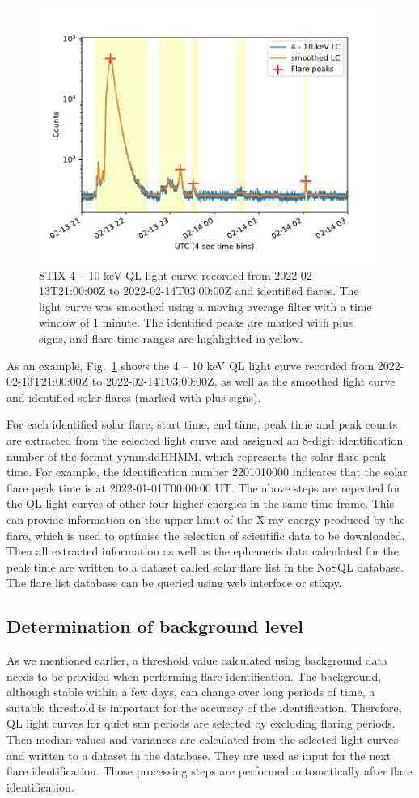 \documentclass[referee]{aa} %
\begin{document}
\begin{figure}
  \centering
  \includegraphics[width=0.8\linewidth]{figures/flaredet.pdf}
  \caption{STIX 4 -- 10 keV QL light curve recorded from  2022-02-13T21:00:00Z to 2022-02-14T03:00:00Z and 
  identified flares.   The light curve was smoothed using a moving average filter with a time window
  of 1 minute. The identified peaks are marked with plus signs, and flare time ranges are highlighted in yellow.
  }
  \label{fig:flare-det}
\end{figure}
As an example, Fig.~\ref{fig:flare-det} shows  the 4 -- 10 keV QL  light curve recorded from 
2022-02-13T21:00:00Z to 2022-02-14T03:00:00Z, as well as the smoothed light curve and  identified solar flares (marked with plus signs).

For each identified solar flare,  start time, end time, peak time and peak 
counts are extracted from the selected light curve and assigned 
an 8-digit identification number of the format yymmddHHMM, which represents the solar flare peak time. 
For example, the identification number 2201010000  indicates that 
the solar flare peak time is at 2022-01-01T00:00:00 UT. 
The above steps are repeated  for the QL light curves of other four higher energies
in the same time frame. This can provide information on the upper limit of the X-ray energy produced by the flare,
which is used to optimise the selection of scientific data to be downloaded. 
Then all extracted information as well as the ephemeris data calculated for the peak time are 
written to a dataset called solar flare list in the NoSQL database.
The flare list database can be queried using web interface or stixpy.
\subsection{Determination of background level}
As we mentioned earlier, a threshold value calculated using background data needs to be provided when
performing flare identification.  
The background, although stable within a few days, can change over long periods of time,
 a suitable threshold is important for the accuracy of the identification. 
 Therefore, QL light curves for  quiet sun periods are selected by excluding flaring periods. 
 Then median values and variances are calculated from the selected light curves and 
 written to a dataset in the database. They are used as input for the next flare identification. 
 Those processing steps are performed automatically after flare identification.
\end{document}
